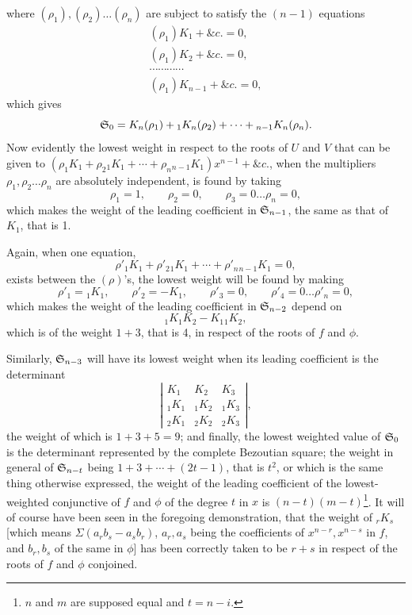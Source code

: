 \documentclass[11pt]{article}
\newcommand{\sourcepage}[1]{\marginpar{\scriptsize p.~#1}}
\begin{document}
\sourcepage{466}
where $(\rho_1),(\rho_2)\ldots(\rho_n)$ are subject to satisfy the $(n-1)$ equations
\[
\begin{gathered}
(\rho_1)K_1+\&c.=0,\\
(\rho_1)K_2+\&c.=0,\\
\cdots\cdots\cdots\cdots\\
(\rho_1)K_{n-1}+\&c.=0,
\end{gathered}
\]
which gives
\[
\mathfrak{S}_0=K_n(\rho_1)+{}_1K_n(\rho_2)+\cdots+{}_{n-1}K_n(\rho_n).
\]
Now evidently the lowest weight in respect to the roots of $U$ and $V$ that can be given to $(\rho_1K_1+\rho_2{}_1K_1+\cdots+\rho_n{}_{n-1}K_1)x^{n-1}+\&c.$, when the multipliers $\rho_1,\rho_2\ldots\rho_n$ are absolutely independent, is found by taking
\[
\rho_1=1,
\qquad
\rho_2=0,
\qquad
\rho_3=0\ldots\rho_n=0,
\]
which makes the weight of the leading coefficient in $\mathfrak{S}_{n-1}$, the same as that of $K_1$, that is 1.

Again, when one equation,
\[
\rho'_1K_1+\rho'_2{}_1K_1+\cdots+\rho'_n{}_{n-1}K_1=0,
\]
exists between the $(\rho)$'s, the lowest weight will be found by making
\[
\rho'_1={}_1K_1,
\qquad
\rho'_2=-K_1,
\qquad
\rho'_3=0,
\qquad
\rho'_4=0\ldots\rho'_n=0,
\]
which makes the weight of the leading coefficient in $\mathfrak{S}_{n-2}$ depend on
\[
{}_1K_1K_2-K_1{}_1K_2,
\]
which is of the weight $1+3$, that is 4, in respect of the roots of $f$ and $\phi$.

Similarly, $\mathfrak{S}_{n-3}$ will have its lowest weight when its leading coefficient is the determinant
\[
\left|
\begin{array}{ccc}
K_1&K_2&K_3\\
{}_1K_1&{}_1K_2&{}_1K_3\\
{}_2K_1&{}_2K_2&{}_2K_3
\end{array}
\right|,
\]
the weight of which is $1+3+5=9$; and finally, the lowest weighted value of $\mathfrak{S}_0$ is the determinant represented by the complete Bezoutian square; the weight in general of $\mathfrak{S}_{n-t}$ being $1+3+\cdots+(2t-1)$, that is $t^2$, or which is the same thing otherwise expressed, the weight of the leading coefficient of the lowest-weighted conjunctive of $f$ and $\phi$ of the degree $t$ in $x$ is $(n-t)(m-t)$\footnote{$n$ and $m$ are supposed equal and $t=n-i$.}. It will of course have been seen in the foregoing demonstration, that the weight of ${}_rK_s$ [which means $\Sigma(a_rb_s-a_sb_r)$, $a_r,a_s$ being the coefficients of $x^{n-r},x^{n-s}$ in $f$, and $b_r,b_s$ of the same in $\phi$] has been correctly taken to be $r+s$ in respect of the roots of $f$ and $\phi$ conjoined.
\end{document}
